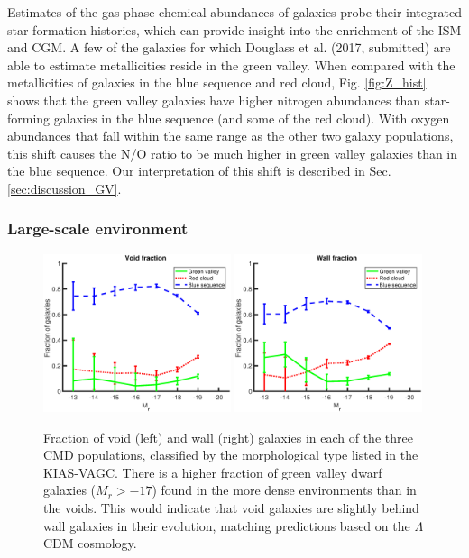 Estimates of the gas-phase chemical abundances of galaxies probe their 
integrated star formation histories, which can provide insight into the 
enrichment of the ISM and CGM.  A few of the galaxies for which Douglass et al. 
(2017, submitted) are able to estimate metallicities reside in the green valley.  
When compared with the metallicities of galaxies in the blue sequence and red 
cloud, Fig. \ref{fig:Z_hist} shows that the green valley galaxies have higher 
nitrogen abundances than star-forming galaxies in the blue sequence (and some of 
the red cloud).  With oxygen abundances that fall within the same range as the 
other two galaxy populations, this shift causes the N/O ratio to be much higher 
in green valley galaxies than in the blue sequence.  Our interpretation of this 
shift is described in Sec. \ref{sec:discussion_GV}.


\subsubsection{Large-scale environment}

\begin{figure}
    \includegraphics[width=0.49\textwidth]{Images/GV/voidFrac_CMD}
    \includegraphics[width=0.49\textwidth]{Images/GV/wallFrac_CMD}
    \caption[Fraction of galaxies in CMD populations by morphological type]
    {Fraction of void (left) and wall (right) galaxies in each of the three CMD 
    populations, classified by the morphological type listed in the KIAS-VAGC.  
    There is a higher fraction of green valley dwarf galaxies ($M_r > -17$) 
    found in the more dense environments than in the voids.  This would indicate 
    that void galaxies are slightly behind wall galaxies in their evolution, 
    matching predictions based on the $\Lambda$CDM cosmology.}
    \label{fig:Mr_bin}
\end{figure}

